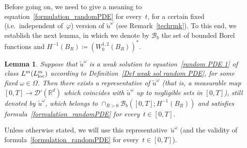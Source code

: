 \documentclass[a4paper,10pt]{article}
\newtheorem{lemma}[theorem]{Lemma}
\newcommand\1{\mathbbm{1}}
\newcommand{\mr}{\mathbb{R}}
\newcommand{\mc}{\mathcal}
\newcommand{\td}{\tilde}
\newcommand\loc{{\rm loc}}
\numberwithin{equation}{section}
\begin{document}
Before going on, we need to give a meaning to equation~\eqref{formulation_randomPDE} for every~$t$, for a certain fixed (i.e.~independent of~$\varphi$) version of $\td{u}^\omega$ (see Remark~\ref{techrmk}). To this end, we establish the next lemma, in which we denote by $\mc{B}_b$ the set of bounded Borel functions and $H^{-1}(B_R)\coloneqq (W^{1,2}_0(B_R))^*$.

\begin{lemma}\label{technicality}
Suppose that $\td{u}^\omega$ is a weak solution to equation~\eqref{random PDE 1} of class $L^{m}(L^{m}_\loc)$ according to Definition~\ref{Def weak sol random PDE}, for some fixed $\omega \in \Omega$. Then there exists a representative of $\td{u}^\omega$ \textup{(}that is, a measurable map $[0,T]\rightarrow\mc{D}'(\mr^d)$ which coincides with $\td{u}^\omega$ up to negligible sets in $[0,T]$\textup{)}, still denoted by $\td{u}^\omega$, which belongs to $\cap_{R>0}\mc{B}_b([0,T];H^{-1}(B_R))$ and satisfies formula~\eqref{formulation_randomPDE} for every~$t \in [0,T]$.
\end{lemma}

Unless otherwise stated, we will use this representative~$\td{u}^\omega$ (and the validity of formula~\eqref{formulation_randomPDE} for every~$t \in [0,T]$).
\end{document}
